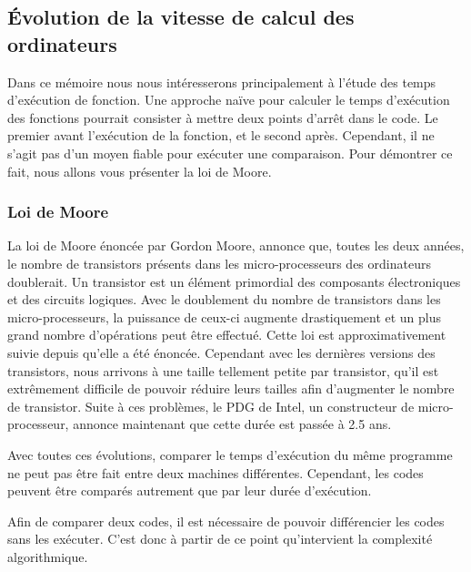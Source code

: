 \documentclass[12pt, twoside, openright]{report}
\begin{document}
\subsection{Évolution de la vitesse de calcul des ordinateurs}

Dans ce mémoire nous nous intéresserons principalement à l'étude des temps d'exécution de fonction. Une approche naïve pour calculer le temps d'exécution des fonctions pourrait consister à mettre deux points d'arrêt dans le code. Le premier avant l'exécution de la fonction, et le second après. Cependant, il ne s'agit pas d'un moyen fiable pour exécuter une comparaison. Pour démontrer ce fait, nous allons vous présenter la loi de Moore.

\subsubsection{Loi de Moore}

La loi de Moore énoncée par Gordon Moore, annonce que, toutes les deux années, le nombre de transistors présents dans les micro-processeurs des ordinateurs doublerait. Un transistor est un élément primordial des composants électroniques et des circuits logiques. Avec le doublement du nombre de transistors dans les micro-processeurs, la puissance de ceux-ci augmente drastiquement et un plus grand nombre d'opérations peut être effectué. Cette loi est approximativement suivie depuis qu'elle a été énoncée. Cependant avec les dernières versions des transistors, nous arrivons à une taille tellement petite par transistor, qu'il est extrêmement difficile de pouvoir réduire leurs tailles afin d'augmenter le nombre de transistor. Suite à ces problèmes, le PDG de Intel, un constructeur de micro-processeur, annonce maintenant que cette durée est passée à 2.5 ans.\cite{moore01} 

Avec toutes ces évolutions, comparer le temps d'exécution du même programme ne peut pas être fait entre deux machines différentes. Cependant, les codes peuvent être comparés autrement que par leur durée d'exécution. 

Afin de comparer deux codes, il est nécessaire de pouvoir différencier les codes sans les exécuter. C'est donc à partir de ce point qu'intervient la complexité algorithmique.

\end{document}
